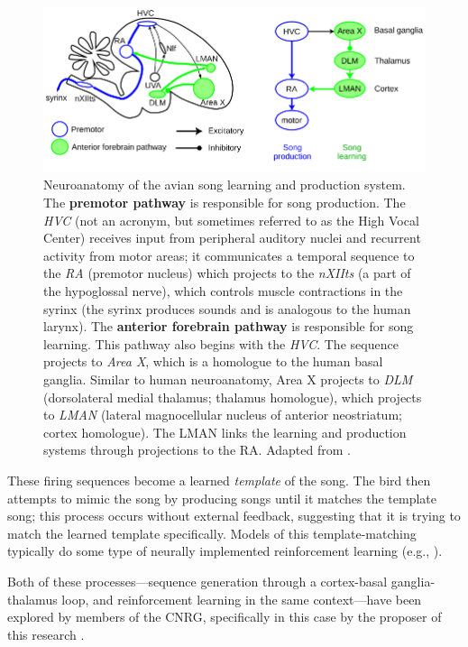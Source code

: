 \documentclass{article}
\begin{document}
\begin{figure}
  \begin{center}
    \includegraphics[width=0.85\linewidth]{birdsong}
  \end{center}
  \caption{Neuroanatomy of the avian song learning and production system.
    The \textbf{premotor pathway} is responsible for song production.
    The \textit{HVC} (not an acronym, but sometimes referred to as the
    High Vocal Center) receives input from peripheral auditory nuclei
    and recurrent activity from motor areas;
    it communicates a temporal sequence to the
    \textit{RA} (premotor nucleus) which projects to the
    \textit{nXIIts} (a part of the hypoglossal nerve),
    which controls muscle contractions in the syrinx
    (the syrinx produces sounds and is analogous
    to the human larynx).
    The \textbf{anterior forebrain pathway} is responsible for
    song learning.
    This pathway also begins with the \textit{HVC}.
    The sequence projects to \textit{Area X},
    which is a homologue to the human basal ganglia.
    Similar to human neuroanatomy,
    Area X projects to \textit{DLM}
    (dorsolateral medial thalamus; thalamus homologue),
    which projects to \textit{LMAN}
    (lateral magnocellular nucleus of anterior neostriatum;
    cortex homologue).
    The LMAN links the learning and production systems
    through projections to the RA.
    Adapted from \citet{fiete2008}.}
  \label{fig:birdsong}
\end{figure}

These firing sequences become
a learned \textit{template} of the song.
The bird then attempts to mimic the song
by producing songs until it matches
the template song;
this process occurs without
external feedback,
suggesting that it is trying
to match the learned template specifically.
Models of this template-matching
typically do some type of neurally
implemented reinforcement learning
(e.g., \citealp{fiete2007}).

Both of these processes---sequence generation
through a cortex-basal ganglia-thalamus loop,
and reinforcement learning in the same context---have
been explored by members of the CNRG,
specifically in this case by
the proposer of this research
\citep{stewart2012}.
\end{document}
